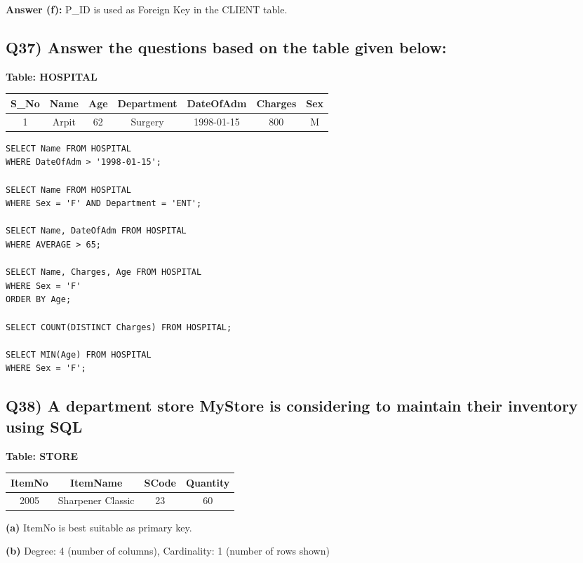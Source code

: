 \documentclass{article}
\begin{document}
\textbf{Answer (f):} P\_ID is used as Foreign Key in the CLIENT table.

\subsection*{Q37) Answer the questions based on the table given below:}

\textbf{Table: HOSPITAL}
\begin{center}
\begin{tabular}{|c|c|c|c|c|c|c|}
\hline
S\_No & Name & Age & Department & DateOfAdm & Charges & Sex \\
\hline
1 & Arpit & 62 & Surgery & 1998-01-15 & 800 & M \\
\hline
\end{tabular}
\end{center}

\begin{lstlisting}
SELECT Name FROM HOSPITAL 
WHERE DateOfAdm > '1998-01-15';

SELECT Name FROM HOSPITAL 
WHERE Sex = 'F' AND Department = 'ENT';

SELECT Name, DateOfAdm FROM HOSPITAL 
WHERE AVERAGE > 65;

SELECT Name, Charges, Age FROM HOSPITAL 
WHERE Sex = 'F' 
ORDER BY Age;

SELECT COUNT(DISTINCT Charges) FROM HOSPITAL;

SELECT MIN(Age) FROM HOSPITAL 
WHERE Sex = 'F';
\end{lstlisting}

\subsection*{Q38) A department store MyStore is considering to maintain their inventory using SQL}

\textbf{Table: STORE}
\begin{center}
\begin{tabular}{|c|c|c|c|}
\hline
ItemNo & ItemName & SCode & Quantity \\
\hline
2005 & Sharpener Classic & 23 & 60 \\
\hline
\end{tabular}
\end{center}

\textbf{(a)} ItemNo is best suitable as primary key.

\textbf{(b)} Degree: 4 (number of columns), Cardinality: 1 (number of rows shown)
\end{document}
